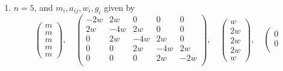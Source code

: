 \begin{lemma}
\begin{enumerate}
$$\begin{matrix}
2m \\
2m \\
m
\end{matrix}
\right),
\quad
\left(
\begin{matrix}
-2w & 2w & 0 & 0 & 0 \\
2w & -4w & 2w & 0 & 0 \\
0 & 2w & -4w & 2w & 0 \\
0 & 0 & 2w & -4w & 4w \\
0 & 0 & 0 & 4w & -8w \\
\end{matrix}
\right),
\quad
\left(
\begin{matrix}
w \\
2w \\
2w \\
2w \\
4w
\end{matrix}
\right),
\quad
\left(
\begin{matrix}
0 \\
0 \\
0 \\
0 \\
0
\end{matrix}
\right)
$$
with $w$ and $m$ arbitrary,
\item
\label{item-up-equal-equal-down}
$n = 5$, and $m_i, a_{ij}, w_i, g_i$ given by
$$
\left(
\begin{matrix}
m \\
m \\
m \\
m \\
m
\end{matrix}
\right),
\quad
\left(
\begin{matrix}
-2w & 2w & 0 & 0 & 0 \\
2w & -4w & 2w & 0 & 0 \\
0 & 2w & -4w & 2w & 0 \\
0 & 0 & 2w & -4w & 2w \\
0 & 0 & 0 & 2w & -2w \\
\end{matrix}
\right),
\quad
\left(
\begin{matrix}
w \\
2w \\
2w \\
2w \\
w
\end{matrix}
\right),
\quad
\left(
\begin{matrix}
0 \\
0 \\

\end{matrix}$$
\end{enumerate}
\end{lemma}
